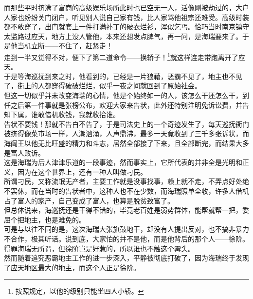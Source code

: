 \begin{multicols}{\theparacolNo}
而那些平时挤满了富商的高级娱乐场所此时也已空无一人，活像刚被劫过的，大户人家也纷纷关门闭户，听见别人说自己家有钱，比人家骂他祖宗还难受。高级时装都不敢穿了，出门就套上一件打满补丁的破衣烂衫，浑似乞丐。恰巧当时南京镇守太监路过应天，地方上没人管他，本来还想发点脾气，再一问，是海瑞要来了。于是他当机立断——不住了，赶紧走！\\

走到一半又觉得不对，便下了第二道命令——换轿子！\footnote{按照规定，以他的级别只能坐四人小轿。}就这样连走带跑离开了应天。\\

于是等海巡抚到来之时，他看到的，已经是一片狼藉，恶霸不见了，地主也不见了，街上的人都穿得破破烂烂，似乎一夜之间就回到了原始社会。\\

但这一切似乎并未改变海瑞的心情，他是个始终如一的人，该怎么干还怎么干，到任之后第一件事就是张榜公布，欢迎大家来告状，此外还特别注明免诉讼费，并告知下属，谁敢借机收钱，我就收拾谁。\\

告状不要钱！那就不告白不告了，于是司法史上的一个奇迹发生了，每天巡抚衙门被挤得像菜市场一样，人潮汹涌，人声鼎沸，最多一天竟收到了三千多张诉状，而海阎王以他无比旺盛的精力和斗志，居然全部接了下来，且全部断完，而结果大多是富人败诉。\\

这是海瑞为后人津津乐道的一段事迹，然而事实上，它所代表的并非全是光明和正义，因为在这个世界上，还有一种人叫做刁民。\\

所谓刁民，又称流氓无产者，主要工作就是没事找事，赖上就不走，不弄点好处绝不罢休，而在当时的告状者中，这种人也不在少数，而海瑞照单全收，许多人借机占了富人的家产，自己变成了富人，也算是脱贫致富了。\\

但总体说来，海巡抚还是干得不错的，毕竟老百姓是弱势群体，能帮就帮一把，委屈个把地主，也是难免的。\\

可是与以往不同的是，这次海瑞大张旗鼓地干，却没有人提出反对，也不搞非暴力不合作，极其听话。说到底，大家怕的并不是他，而是他背后的那个人——徐阶。\\

得罪海瑞无所谓，但徐阶岂是好惹的，所以谁也不触这个霉头。\\

然而随着追究恶霸地主工作的进一步深入，平静被彻底打破了，因为海瑞终于发现了应天地区最大的地主，而这个人正是徐阶。\\


\end{multicols}
